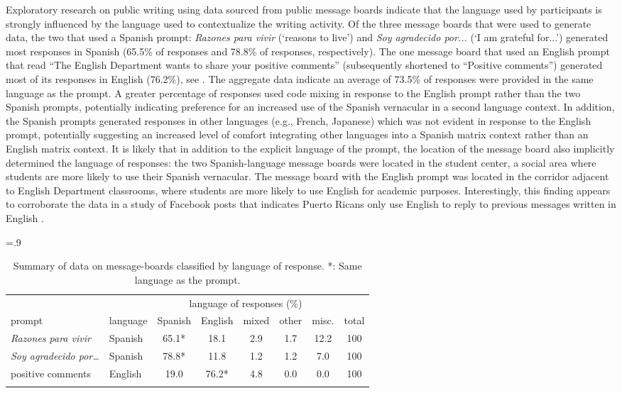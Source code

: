 \documentclass[output=paper,colorlinks,citecolor=brown]{langscibook}
\begin{document}
Exploratory research on public writing using data sourced from public message boards indicate that the language used by participants is strongly influenced by the language used to contextualize the writing activity. Of the three message boards that were used to generate data, the two that used a Spanish prompt: \emph{Razones para vivir} (‘reasons to live’) and \emph{Soy agradecido por...} (‘I am grateful for...’) generated most responses in Spanish (65.5\% of responses and 78.8\% of responses, respectively). The one message board that used an English prompt that read “The English Department wants to share your positive comments” (subsequently shortened to “Positive comments”) generated most of its responses in English (76.2\%), see . The aggregate data indicate an average of 73.5\% of responses were provided in the same language as the prompt. A greater percentage of responses used code mixing in response to the English prompt rather than the two Spanish prompts, potentially indicating preference for an increased use of the Spanish vernacular in a second language context. In addition, the Spanish prompts generated responses in other languages (e.g., French, Japanese) which was not evident in response to the English prompt, potentially suggesting an increased level of comfort integrating other languages into a Spanish matrix context rather than an English matrix context. It is likely that in addition to the explicit language of the prompt, the location of the message board also implicitly determined the language of responses: the two Spanish-language message boards were located in the student center, a social area where students are more likely to use their Spanish vernacular. The message board with the English prompt was located in the corridor adjacent to English Department classrooms, where students are more likely to use English for academic purposes. Interestingly, this finding appears to corroborate the data in a study of Facebook posts that indicates Puerto Ricans only use English to reply to previous messages written in English \citep{Carroll_Mari_2017}.

\begin{table}
\tabcolsep=.9\tabcolsep
\small\begin{tabular}{llcccccc}
    \lsptoprule
    &  & \multicolumn{5}{c}{{language of responses (\%)}} &  \\ \cmidrule(lr){2-8}
    {prompt} & {language} & {Spanish} & {English} & mixed & other & misc. & {total} \\\midrule
    \textit{Razones para vivir} & Spanish & \cellcolor[HTML]{D9D9D9} 65.1* & 18.1 & 2.9 & 1.7 & 12.2 & 100 \\
    \textit{Soy agradecido por…} & Spanish & \cellcolor[HTML]{D9D9D9} 78.8* & 11.8 & 1.2 & 1.2 & 7.0 & 100 \\
    positive comments & English & 19.0 & \cellcolor[HTML]{D9D9D9} 76.2* & 4.8 & 0.0 & 0.0 & 100 \\ 
    \lspbottomrule
\end{tabular}
\caption{Summary of data on message-boards classified by language of response. *: Same language as the prompt.}
\label{tab:tab2_07}
\end{table}
\end{document}
